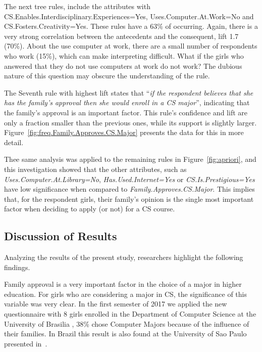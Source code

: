 The next tree rules, include the attributes with CS.Enables.Interdisciplinary.Experiences=Yes, Uses.Computer.At.Work=No and CS.Fosters.Creativity=Yes. These rules have a 63\% of occurring. Again, there is a very strong correlation between the antecedents and the consequent, lift 1.7 (70\%). About the use computer at work, there are a small number of respondents who work (15\%), which can make interpreting difficult. What if the girls who answered that they do not use computers at work do not work? The dubious nature of this question may obscure the understanding of the rule.

The Seventh rule with highest lift states that ``\emph{if the respondent believes that she has the family's approval then she would enroll in a CS major}'', indicating that the family's approval is an important factor. This rule's confidence and lift are only a fraction smaller than the previous ones, while its support is slightly larger. Figure~\ref{fig:freq.Family.Approves.CS.Major} presents the data for this in more detail.

Thee same analysis was applied to the remaining rules in Figure~\ref{fig:apriori}, and this investigation showed that the other attributes, such as \emph{Uses.Computer.At.Library=No}, \emph{Has.Used.Internet=Yes} or \emph{CS.Is.Prestigious=Yes} have low significance when compared to \emph{Family.Approves.CS.Major}. This implies that, for the respondent girls, their family's opinion is the single most important factor when deciding to apply (or not) for a CS course.


\subsection{Discussion of Results}
Analyzing the results of the present study, researchers highlight the following findings.

Family approval is a very important factor in the choice of a major in higher education. For girls who are considering a major in CS, the significance of this variable was very clear. In the first semester of 2017 we applied the new questionnaire with 8 girls enrolled in the Department of Computer Science at the University of Brasilia , 38\% chose Computer Majors because of the influence of their families. In Brazil this result is also found at the University of Sao Paulo presented in~\cite{saboya_2009}.

